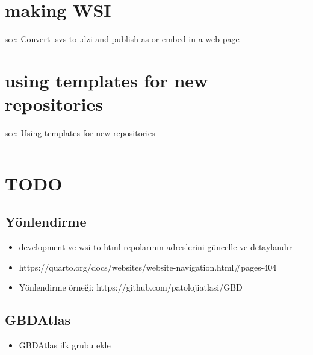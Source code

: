 \documentclass[
  letterpaper,
  DIV=11,
  numbers=noendperiod]{scrreprt}
\providecommand{\tightlist}{%
  \setlength{\itemsep}{0pt}\setlength{\parskip}{0pt}}\usepackage{longtable,booktabs,array}
\begin{document}
\hypertarget{making-wsi}{%
\chapter{making WSI}\label{making-wsi}}

see:
\href{https://github.com/pathologyatlas/make-html-WSI\#convert-svs-to-dzi-and-publish-as-or-embed-in-a-web-page}{Convert
.svs to .dzi and publish as or embed in a web page}

\hypertarget{using-templates-for-new-repositories}{%
\chapter{using templates for new
repositories}\label{using-templates-for-new-repositories}}

see: \href{https://github.com/pathologyatlas/template}{Using templates
for new repositories}

\begin{center}\rule{0.5\linewidth}{0.5pt}\end{center}

\hypertarget{todo}{%
\chapter{TODO}\label{todo}}

\hypertarget{yuxf6nlendirme}{%
\section{Yönlendirme}\label{yuxf6nlendirme}}

\begin{itemize}
\tightlist
\item
  development ve wsi to html repolarının adreslerini güncelle ve
  detaylandır
\item
  https://quarto.org/docs/websites/website-navigation.html\#pages-404
\item
  Yönlendirme örneği: https://github.com/patolojiatlasi/GBD
\end{itemize}

\hypertarget{gbdatlas}{%
\section{GBDAtlas}\label{gbdatlas}}

\begin{itemize}
\tightlist
\item
  GBDAtlas ilk grubu ekle
\end{itemize}
\end{document}
